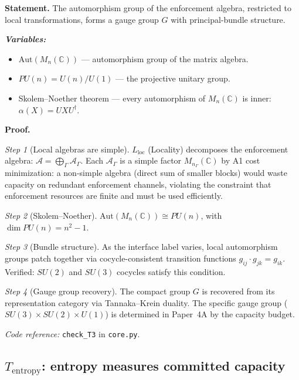 \documentclass[11pt]{article}
\newenvironment{varlist}{\begin{itemize}[nosep,leftmargin=2em]}{\end{itemize}}
\newcommand{\coderef}[2]{\smallskip\noindent\textit{Code reference:} \texttt{#1} in \texttt{#2}.}
\begin{document}
\begin{tcolorbox}[apfbox, title={T3: $L_{\mathrm{loc}}$ (Locality) $\to$ Gauge Structure}]
\textbf{Statement.}  The automorphism group of the enforcement algebra, restricted to local transformations, forms a gauge group $G$ with principal-bundle structure.

\smallskip\noindent\textbf{\textit{Variables:}}
\begin{varlist}
\item $\mathrm{Aut}(M_n(\mathbb{C}))$ --- automorphism group of the matrix algebra.
\item $PU(n) = U(n)/U(1)$ --- the projective unitary group.
\item Skolem--Noether theorem --- every automorphism of $M_n(\mathbb{C})$ is inner: $\alpha(X) = UXU^\dagger$.
\end{varlist}

\smallskip\noindent\textbf{Proof.}

\textit{Step 1} (Local algebras are simple).  $L_{\mathrm{loc}}$ (Locality) decomposes the enforcement algebra: $\mathcal{A} = \bigoplus_\Gamma \mathcal{A}_\Gamma$.  Each $\mathcal{A}_\Gamma$ is a simple factor $M_{n_\Gamma}(\mathbb{C})$ by A1 cost minimization: a non-simple algebra (direct sum of smaller blocks) would waste capacity on redundant enforcement channels, violating the constraint that enforcement resources are finite and must be used efficiently.

\textit{Step 2} (Skolem--Noether).  $\mathrm{Aut}(M_n(\mathbb{C})) \cong PU(n)$, with $\dim PU(n) = n^2 - 1$.

\textit{Step 3} (Bundle structure).  As the interface label varies, local automorphism groups patch together via cocycle-consistent transition functions $g_{ij} \cdot g_{jk} = g_{ik}$.  Verified: $SU(2)$ and $SU(3)$ cocycles satisfy this condition.

\textit{Step 4} (Gauge group recovery).  The compact group $G$ is recovered from its representation category via Tannaka--Krein duality.  The specific gauge group ($SU(3) \times SU(2) \times U(1)$) is determined in Paper~4A by the capacity budget.

\coderef{check\_T3}{core.py}
\end{tcolorbox}


\subsection{\texorpdfstring{$T_{\mathrm{entropy}}$}{T entropy}: entropy measures committed capacity}
\end{document}

